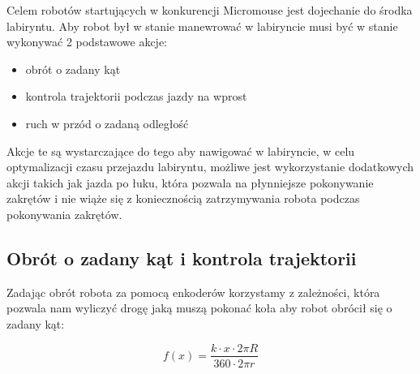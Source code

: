 \documentclass[12pt,a4paper,twoside,openright,fleqn]{mwrep}
\begin{document}
Celem robotów startujących w konkurencji Micromouse jest dojechanie do środka labiryntu. Aby robot był w stanie manewrować w labiryncie musi być w stanie wykonywać 2 podstawowe akcje:

\begin{itemize}
    \item obrót o zadany kąt 
    \item kontrola trajektorii podczas jazdy na wprost
    \item ruch w przód o zadaną odległość
\end{itemize}


Akcje te są wystarczające do tego aby nawigować w labiryncie, w celu optymalizacji czasu przejazdu labiryntu, możliwe jest wykorzystanie dodatkowych akcji takich jak jazda po łuku, która pozwala na płynniejsze pokonywanie zakrętów i nie wiąże się z koniecznością zatrzymywania robota podczas pokonywania zakrętów.

\subsection{Obrót o zadany kąt i kontrola trajektorii} %

Zadając obrót robota za pomocą enkoderów korzystamy z zależności, która pozwala nam wyliczyć drogę jaką muszą pokonać koła aby robot obrócił się o zadany kąt:

$$ f(x)=\frac{ k \cdot x \cdot  2\pi R}{360 \cdot 2 \pi r} $$
\end{document}
